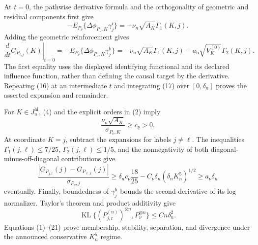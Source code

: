 At \(t=0\), the pathwise derivative formula and the orthogonality of geometric and residual components first give
\[
 -E_{P_\nu}\{\Delta\phi_{P_\nu,K}\gamma_j^{\mathrm r}\}
 =-\nu_n\sqrt{A_K}\Gamma_1(K,j).                                        \tag{17}
\]
Adding the geometric reinforcement gives
\[
 \left.\frac{d}{dt}G_{P_{t,j}}(K)\right|_{t=0}
 =-E_{P_\nu}\{\Delta\phi_{P_\nu,K}\gamma_j^{\mathrm h}\}
 =-\nu_n\sqrt{A_K}\Gamma_1(K,j)
 -a_{\mathrm h}\sqrt{V_K^{(0)}}\Gamma_2(K,j).                           \tag{18}
\]
The first equality uses the displayed identifying functional and its declared influence function, rather than defining the causal target by the derivative.  Repeating (16) at an intermediate \(t\) and integrating (17) over \([0,\delta_n]\) proves the asserted expansion and remainder.

For \(K\in J_n^{\mathrm{hi}}\), (4) and the explicit orders in (2) imply
\[
 \frac{\nu_n\sqrt{A_K}}{\sigma_{P_\nu,K}}
 \geq c_{\underline\nu}>0.                                               \tag{19}
\]
At coordinate \(K=j\), subtract the expansions for labels \(j\ne\ell\).  The inequalities \(\Gamma_1(j,\ell)\leq7/25\), \(\Gamma_2(j,\ell)\leq1/5\), and the nonnegativity of both diagonal-minus-off-diagonal contributions give
\[
 \frac{|G_{P_{j,\mathrm r}}(j)-G_{P_{\ell,\mathrm r}}(j)|}{\sigma_{P_\nu,j}}
 \geq\delta_nc_{\underline\nu}\frac{18}{25}
 -C_{\underline\nu}\delta_n(\delta_nK_n^5)^{1/2}
 \geq a_{\underline\nu}\delta_n                                       \tag{20}
\]
eventually.  Finally, boundedness of \(\gamma_j^{\mathrm h}\) bounds the second derivative of its log normalizer.  Taylor's theorem and product additivity give
\[
 \operatorname{KL}\{(P_{j,\mathrm r}^{(n)})^{\otimes n},P_\nu^{\otimes n}\}
 \leq Cn\delta_n^2.                                                       \tag{21}
\]
Equations (1)--(21) prove membership, stability, separation, and divergence under the announced conservative \(K_n^5\) regime.